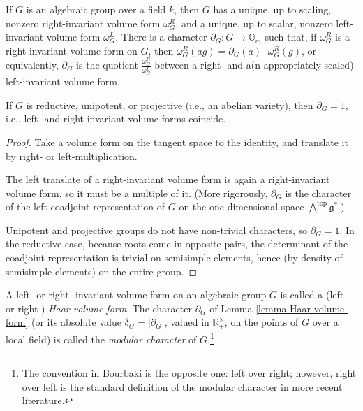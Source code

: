 \begin{lemma}
 \label{lemma-Haar-volume-form}
If $G$ is an algebraic group over a field $k$, then $G$ has a unique, up to scaling, nonzero right-invariant volume form $\omega_G^R$, and a unique, up to scalar, nonzero left-invariant volume form $\omega_G^L$. There is a character $\partial_G: G\to \mathbb G_m$ such that, if $\omega_G^R$ is a right-invariant volume form on $G$, then $\omega_G^R(ag) = \partial_G(a) \cdot \omega_G^R(g)$, or equivalently, $\partial_G$ is the quotient $\frac{\omega_G^R}{\omega^L_G}$ between a right- and a(n appropriately scaled) left-invariant volume form. 

If $G$ is reductive, unipotent, or projective (i.e., an abelian variety), then $\partial_G = 1$, i.e., left- and right-invariant volume forms coincide.
\end{lemma}

\begin{proof}
 Take a volume form on the tangent space to the identity, and translate it by right- or left-multiplication.

 The left translate of a right-invariant volume form is again a right-invariant volume form, so it must be a multiple of it. (More rigorously, $\partial_G$ is the character of the left coadjoint representation of $G$ on the one-dimensional space $\bigwedge^{\text{top}} \mathfrak g^*$.)
 
 Unipotent and projective groups do not have non-trivial characters, so $\partial_G=1$. In the reductive case, because roots come in opposite pairs, the determinant of the coadjoint representation is trivial on semisimple elements, hence (by density of semisimple elements) on the entire group.
\end{proof}

\begin{definition}
\label{definition-modular-character}
A left- or right- invariant volume form on an algebraic group $G$ is called a (left- or right-) {\it Haar volume form}. The character $\partial_G$ of Lemma \ref{lemma-Haar-volume-form} (or its absolute value $\delta_G = |\partial_G|$, valued in $\mathbb R^\times_+$, on the points of $G$ over a local field) is called the {\it modular character} of $G$.\footnote{The convention in Bourbaki is the opposite one: left over right; however, right over left is the standard definition of the modular character in more recent literature.} 
\end{definition}



